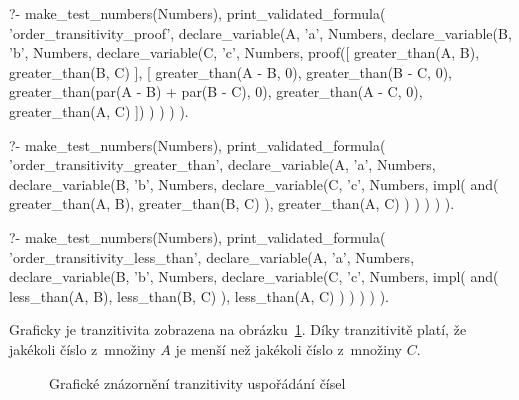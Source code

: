 \begin{prolog}
?-	make_test_numbers(Numbers),
	print_validated_formula(
		'order_transitivity_proof',
		declare_variable(A, 'a', Numbers,
			declare_variable(B, 'b', Numbers,
				declare_variable(C, 'c', Numbers,
					proof([
						greater_than(A, B),
						greater_than(B, C)
					],
					[
						greater_than(A - B, 0),
						greater_than(B - C, 0),
						greater_than(par(A - B) + par(B - C), 0),
						greater_than(A - C, 0),
						greater_than(A, C)
					])
				)
			)
		)
	).
\end{prolog}

\begin{fact}
\begin{prolog}
?-	make_test_numbers(Numbers),
	print_validated_formula(
		'order_transitivity_greater_than',
		declare_variable(A, 'a', Numbers,
			declare_variable(B, 'b', Numbers,
				declare_variable(C, 'c', Numbers,
					impl(
						and(
							greater_than(A, B),
							greater_than(B, C)
						),
						greater_than(A, C)
					)
				)
			)
		)
	).
\end{prolog}
\begin{prolog}
?-	make_test_numbers(Numbers),
	print_validated_formula(
		'order_transitivity_less_than',
		declare_variable(A, 'a', Numbers,
			declare_variable(B, 'b', Numbers,
				declare_variable(C, 'c', Numbers,
					impl(
						and(
							less_than(A, B),
							less_than(B, C)
						),
						less_than(A, C)
					)
				)
			)
		)
	).
\end{prolog}
\end{fact}

Graficky je tranzitivita zobrazena na obrázku~\ref{img:ordering_transitivity}. Díky tranzitivitě platí, že jakékoli číslo z~množiny \(A\) je menší než jakékoli číslo z~množiny \(C\).

\begin{figure}[!h]
\centering
{}
\caption{Grafické znázornění tranzitivity uspořádání čísel}
\label{img:ordering_transitivity}
\end{figure}

